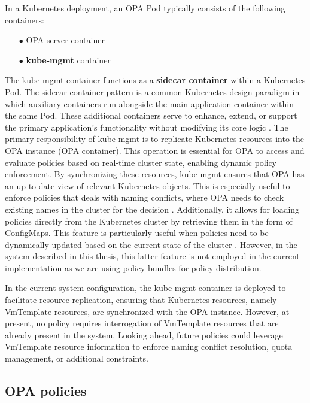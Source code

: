 In a Kubernetes deployment, an OPA Pod typically consists of the following containers:
\begin{itemize}[itemsep=0.2pt, topsep=1pt]
  \item[$\bullet$] OPA server container
  \item[$\bullet$] \textbf{kube-mgmt} container \\
\end{itemize} 

The kube-mgmt container functions as a \textbf{sidecar container} within a Kubernetes Pod. The sidecar container pattern is a common Kubernetes design paradigm in which auxiliary containers run alongside the main application container within the same Pod. These additional containers serve to enhance, extend, or support the primary application's functionality without modifying its core logic \cite{sidecar_containers}. 
The primary responsibility of kube-mgmt is to replicate Kubernetes resources into the OPA instance (OPA container). This operation is essential for OPA to access and evaluate policies based on real-time cluster state, enabling dynamic policy enforcement. By synchronizing these resources, kube-mgmt ensures that OPA has an up-to-date view of relevant Kubernetes objects.
This is especially useful to enforce policies that deals with naming conflicts, where OPA needs to check existing names in the cluster for the decision \cite{kube-mgmt}.
Additionally, it allows for loading policies directly from the Kubernetes cluster by retrieving them in the form of ConfigMaps. This feature is particularly useful when policies need to be dynamically updated based on the current state of the cluster \cite{kube-mgmt}. However, in the system described in this thesis, this latter feature is not employed in the current implementation as we are using policy bundles for policy distribution.

In the current system configuration, the kube-mgmt container is deployed to facilitate resource replication, ensuring that Kubernetes resources, namely VmTemplate resources, are synchronized with the OPA instance. However, at present, no policy requires interrogation of VmTemplate resources that are already present in the system.
Looking ahead, future policies could leverage VmTemplate resource information to enforce naming conflict resolution, quota management, or additional constraints.

\newpage

\subsection{OPA policies}
\label{sec:opa_policies}

